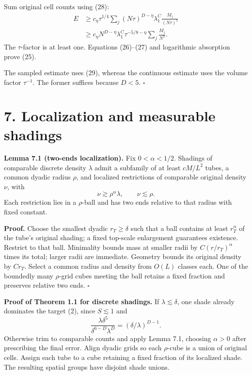 \documentclass[
  11pt,
  a4paper,
]{article}
\begin{document}
Sum original cell counts using (28): \[
 \begin{aligned}
 E&\ge c_\eta\tau^{1/4}\sum_j
       (N\tau)^{D-\eta}\lambda_1^C
              \frac{M_j}{(N\tau)^5}\\
 &\ge c_\eta N^{D-\eta}\lambda_1^C
       \tau^{-5/8-\eta}\sum_j\frac{M_j}{N^5}.
 \end{aligned}
\] The \(\tau\)-factor is at least one. Equations (26)--(27) and
logarithmic absorption prove (25).

The sampled estimate uses (29), whereas the continuous estimate uses the
volume factor \(\tau^{-1}\). The former suffices because \(D<5\).
\(\square\)

\hypertarget{localization-and-measurable-shadings}{%
\section{7. Localization and measurable
shadings}\label{localization-and-measurable-shadings}}

\textbf{Lemma 7.1 (two-ends localization).} Fix \(0<\alpha<1/2\).
Shadings of comparable discrete density \(\lambda\) admit a subfamily of
at least \(cM/L^2\) tubes, a common dyadic radius \(\rho\), and
localized restrictions of comparable original density \(\nu\), with \[
 \nu\gtrsim\rho^\alpha\lambda,\qquad \nu\lesssim\rho.
\tag{31}\label{eq:31}
\] Each restriction lies in a \(\rho\)-ball and has two ends relative to
that radius with fixed constant.

\textbf{Proof.} Choose the smallest dyadic \(r_T\ge\delta\) such that a
ball contains at least \(r_T^\alpha\) of the tube's original shading; a
fixed top-scale enlargement guarantees existence. Restrict to that ball.
Minimality bounds mass at smaller radii by \(C(r/r_T)^\alpha\) times its
total; larger radii are immediate. Geometry bounds its original density
by \(Cr_T\). Select a common radius and density from \(O(L)\) classes
each. One of the boundedly many \(\rho\)-grid cubes meeting the ball
retains a fixed fraction and preserves relative two ends. \(\square\)

\textbf{Proof of Theorem 1.1 for discrete shadings.} If
\(\lambda\lesssim\delta\), one shade already dominates the target (2),
since \(S\lesssim1\) and \[
 \frac{\lambda\delta^5}{\delta^{6-D}\lambda^D}
 =(\delta/\lambda)^{D-1}.
\] Otherwise trim to comparable counts and apply Lemma 7.1, choosing
\(\alpha>0\) after prescribing the final error. Align dyadic grids so
each \(\rho\)-cube is a union of original cells. Assign each tube to a
cube retaining a fixed fraction of its localized shade. The resulting
spatial groups have disjoint shade unions.
\end{document}
